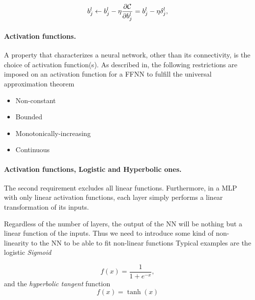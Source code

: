 \documentclass[%
oneside,                 %
final,                   %
10pt]{article}
\begin{document}
\[
b_j^l \leftarrow b_j^l-\eta \frac{\partial {\cal C}}{\partial b_j^l}=b_j^l-\eta \delta_j^l,
\]

\paragraph{Activation functions.}
A property that characterizes a neural network, other than its
connectivity, is the choice of activation function(s).  As described
in, the following restrictions are imposed on an activation function
for a FFNN to fulfill the universal approximation theorem

\begin{itemize}
  \item Non-constant

  \item Bounded

  \item Monotonically-increasing

  \item Continuous
\end{itemize}

\noindent
\paragraph{Activation functions, Logistic and Hyperbolic ones.}
The second requirement excludes all linear functions. Furthermore, in
a MLP with only linear activation functions, each layer simply
performs a linear transformation of its inputs.

Regardless of the number of layers, the output of the NN will be
nothing but a linear function of the inputs. Thus we need to introduce
some kind of non-linearity to the NN to be able to fit non-linear
functions Typical examples are the logistic \emph{Sigmoid}

\[
 f(x) = \frac{1}{1 + e^{-x}},
\]
and the \emph{hyperbolic tangent} function
\[
 f(x) = \tanh(x)
\]

\end{document}
